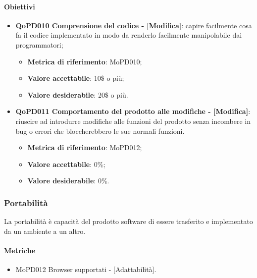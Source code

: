 \documentclass[../piano-di-qualifica.tex]{subfiles}
\begin{document}
\paragraph{Obiettivi}
\label{sub:obiettivi}
\begin{itemize}
    \item \textbf{QoPD010 Comprensione del codice - [Modifica]}: capire facilmente cosa fa il codice implementato in modo da renderlo facilmente manipolabile dai programmatori;
        \begin{itemize}
            \item \textbf{Metrica di riferimento}: MoPD010;
            \item \textbf{Valore accettabile}: 10\$ o più;
            \item \textbf{Valore desiderabile}: 20\$ o più.
        \end{itemize}
    \item \textbf{QoPD011 Comportamento del prodotto alle modifiche  - [Modifica]}: riuscire ad introdurre modifiche alle funzioni del prodotto senza incombere in bug o errori che bloccherebbero le sue normali funzioni.
        \begin{itemize}
            \item \textbf{Metrica di riferimento}: MoPD012;
            \item \textbf{Valore accettabile}: 0\%;
            \item \textbf{Valore desiderabile}: 0\%.
        \end{itemize}
\end{itemize}


\subsubsection{Portabilità}%
\label{sub:portabilita}
La portabilità è capacità del prodotto software di essere trasferito e implementato da un ambiente a un altro.

\paragraph{Metriche}
\label{sub:metriche}
\begin{itemize}
    \item MoPD012 Browser supportati - [Adattabilità].
\end{itemize}
\end{document}
